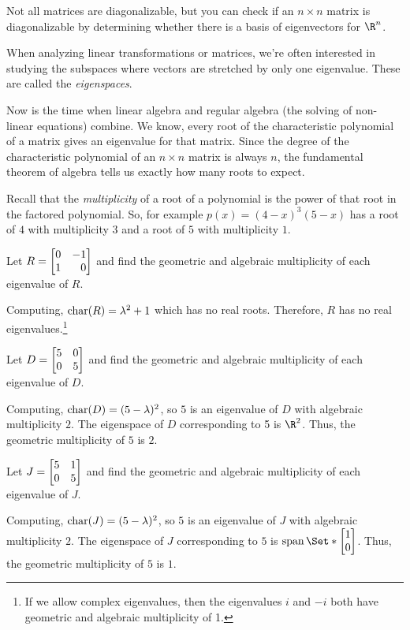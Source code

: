 \begin{emphbox}[Takeaway]
	Not all matrices are diagonalizable, but you can check if an $n\times n$
	matrix is diagonalizable by determining whether there is a basis of eigenvectors for $\R^n$.
\end{emphbox}


When analyzing linear transformations or matrices, we're often interested in
studying the subspaces where vectors are stretched by only one eigenvalue. These 
are called the \emph{eigenspaces}.


Now is the time when linear algebra and regular algebra (the solving of non-linear equations)
combine. We know, every root of the characteristic polynomial of a matrix gives an eigenvalue
for that matrix. Since the degree of the characteristic polynomial of an $n\times n$ matrix
is always $n$, the fundamental theorem of algebra tells us exactly how many roots to expect.

Recall that the \emph{multiplicity} of a root of a polynomial is the power of that root
in the factored polynomial. So, for example $p(x)=(4-x)^3(5-x)$ has a root of $4$ with multiplicity
$3$ and a root of $5$ with multiplicity $1$.

\begin{example}
	Let $R=\mat{0&-1\\1&0}$ and find the geometric and algebraic multiplicity of each eigenvalue of $R$.
	
	Computing, $\operatorname{char}(R)=\lambda^2+1$ which has no real roots. Therefore,
	$R$ has no real eigenvalues.\footnote{ If we allow complex eigenvalues, then the eigenvalues
	$i$ and $-i$ both have geometric and algebraic multiplicity of 1.}
\end{example}

\begin{example}
	Let $D=\mat{5&0\\0&5}$ and find the geometric and algebraic multiplicity of each eigenvalue of $D$.
	
	Computing, $\operatorname{char}(D)=(5-\lambda)^2$, so $5$ is an eigenvalue of $D$ with algebraic multiplicity $2$.
	The eigenspace of $D$ corresponding to 5 is $\R^2$. Thus, the geometric multiplicity of $5$ is $2$.
\end{example}

\begin{example}
	Let $J=\mat{5&1\\0&5}$ and find the geometric and algebraic multiplicity of each eigenvalue of $J$.
	
	Computing, $\operatorname{char}(J)=(5-\lambda)^2$, so $5$ is an eigenvalue of $J$ with algebraic multiplicity $2$.
	The eigenspace of $J$ corresponding to $5$ is $\Span\Set*{\mat{1\\0}}$. Thus, the geometric 
	multiplicity of $5$ is $1$.
\end{example}

